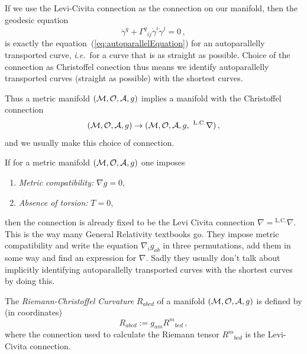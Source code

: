 \documentclass[11pt, a4paper, twocolumn]{article} %
\begin{document}
\begin{note}
    If we use the Levi-Civita connection as the connection on our manifold,
    then the geodesic equation
    \begin{equation}
        \ddot{\gamma}^q + \Gamma^q{}_{ij}\dot{\gamma}^i \dot{\gamma}^j = 0\,,
    \end{equation}
    is exactly the equation~(\ref{eq:autoparallelEquation}) for an autoparallelly transported curve,
    \textit{i.e.}\ for a curve that is as straight as possible.
    Choice of the connection as Christoffel conection thus means we identify autoparallelly transported
    curves (straight as possible) with the shortest curves.
\end{note}
\begin{note}
    Thus a metric manifold $(\mathcal{M}, \mathcal{O}, \mathcal{A}, g)$ implies a manifold with the Christoffel connection
    \begin{equation}
        (\mathcal{M}, \mathcal{O}, \mathcal{A}, g) \to (\mathcal{M}, \mathcal{O}, \mathcal{A}, g,~^\text{L.C.}\nabla)\,,
    \end{equation}
    and we usually make this choice of connection.
\end{note}
\begin{note}
    If for a metric manifold $(\mathcal{M}, \mathcal{O}, \mathcal{A}, g)$ one imposes
    \begin{enumerate}
        \item \textit{Metric compatibility:} $\nabla g = 0$,
        \item \textit{Absence of torsion:} $T=0$,
    \end{enumerate}
    then the connection is already fixed to be the Levi Civita connection
    $\nabla = {}^\text{L.C.}\nabla$.
    This is the way many General Relativity textbooks go.
    They impose metric compatibility and write the equation $\nabla_i g_{ab}$ in
    three permutations, add them in some way and find an expression for $\nabla$.
    Sadly they usually don't talk about implicitly identifying autoparallelly transported
    curves with the shortest curves by doing this.
\end{note}
\begin{defn}
    The \textit{Riemann-Christoffel Curvature} $R_{abcd}$ of a manifold
    $(\mathcal{M}, \mathcal{O}, \mathcal{A}, g)$ is defined by (in coordinates)
    \begin{equation}
        R_{abcd} := g_{am} R^{m}{}_{bcd}\,,
    \end{equation}
where the connection used to calculate the Riemann tensor $R^m{}_{bcd}$ is the Levi-Civita connection.
\end{defn}
\end{document}
